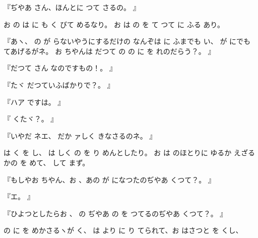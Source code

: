 
『ぢやあ
さん、ほんとに
つて
さるの。
』

お
の
は
に
も
く
びて
めるなり。
お
は
の
を
て
つて
に
ふる
あり。

『あヽ、
の
が
らないやうにするだけの
なんぞは
に
ふまでも
い、
が
にでも
てあげるがネ。
お
ちやんは
だつて
の
の
に
を
れのだらう？。
』

『だつて
さん
なのですもの！。
』

『たヾ
だつていふばかりで？。
』

『ハア
ですは。
』

『
くたヾ？。
』

『いやだ
ネエ、
だか
ァしく
きなさるのネ。
』

は
く
を
し、
は
しく
の
を
り
めんとしたり。
お
は
のほとりに
ゆるか
えざるかの
を
めて、
して
まず。

『もしやお
ちやん、お
、あの
が
になつたのぢやあ
くつて？。
』

『エ。
』

『ひよつとしたらお
、
の
ぢやあ
の
を
つてるのぢやあ
くつて？。
』

の
に
を
めかさるヽが
く、
は
より
に
り
てられて、お
はさつと
を
くし、

